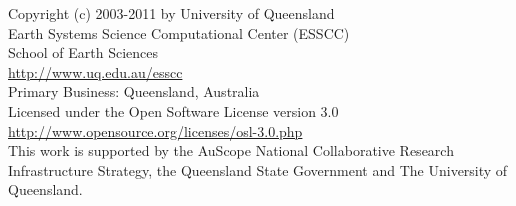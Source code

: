 
%
%
%


\begin{center}
Copyright (c) 2003-2011 by University of Queensland	\\
Earth Systems Science Computational Center (ESSCC)	\\
School of Earth Sciences \\
\url{http://www.uq.edu.au/esscc}			\\
Primary Business: Queensland, Australia			\\
Licensed under the Open Software License version 3.0	\\
\url{http://www.opensource.org/licenses/osl-3.0.php}	\\

This work is supported by the AuScope National Collaborative Research Infrastructure Strategy, 
the Queensland State Government and The University of Queensland.

\end{center}

